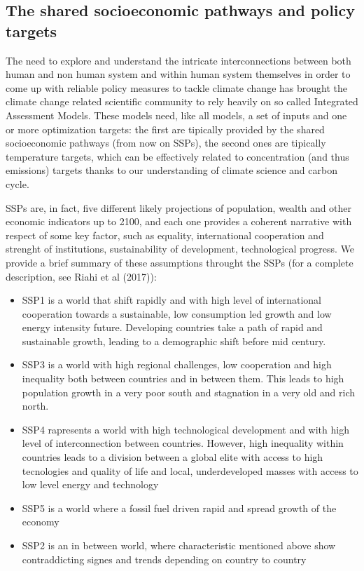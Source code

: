 \documentclass[11pt]{article} %
\begin{document}
\subsection{The shared socioeconomic pathways and policy targets} \label {SSPandRCP} 

The need to explore and understand the intricate interconnections between both human and non human system and within human system themselves in order to come up with reliable policy measures to tackle climate change has brought the climate change related scientific community to rely heavily on so called Integrated Assessment Models. These models need, like all models, a set of inputs and one or more optimization targets: the first are tipically provided by the shared socioeconomic pathways (from now on SSPs), the second ones are tipically temperature targets, which can be effectively related to concentration (and thus emissions) targets thanks to our understanding of climate science and carbon cycle. \par SSPs are, in fact, five different likely projections of population, wealth and other economic indicators up to 2100, and each one provides a coherent narrative with respect of some key factor, such as equality, international cooperation and strenght of institutions, sustainability of development, technological progress. We provide a brief summary of these assumptions throught the SSPs (for a complete description, see Riahi et al (2017)): 

\begin{itemize}
\item SSP1 is a world that shift rapidly and with high level of international cooperation towards a sustainable, low consumption led growth and low energy intensity future. Developing countries take a path of rapid and sustainable growth, leading to a demographic shift before mid century. 
\item SSP3 is a world with high regional challenges, low cooperation and high inequality both between countries and in between them. This leads to high population growth in a very poor south and stagnation in a very old and rich north.
\item SSP4 rapresents a world with high technological development and with high level of interconnection between countries. However, high inequality within countries leads to a division between a global elite with access to high tecnologies and quality of life and local, underdeveloped masses with access to low level energy and technology
\item SSP5 is a world where a fossil fuel driven rapid and spread growth of the economy
\item SSP2 is an in between world, where characteristic mentioned above show contraddicting signes and trends depending on country to country
\end{itemize}
\end{document}
